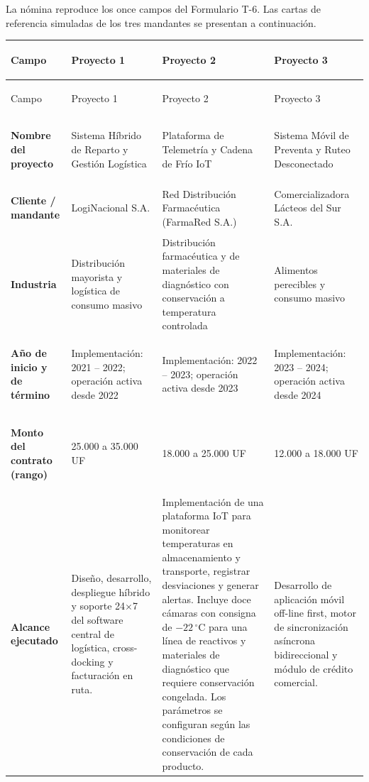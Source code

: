 \documentclass[11pt]{article}
\begin{document}
\clearpage
{}
\par\vspace{2pt}
{\small La nómina reproduce los once campos del Formulario T-6. Las cartas de referencia simuladas de los tres mandantes se presentan a continuación.}
\begingroup
\footnotesize\renewcommand{\arraystretch}{1.0}\setlength{\tabcolsep}{4pt}\setlength{\aboverulesep}{1.5pt}\setlength{\belowrulesep}{1.5pt}
\begin{xltabular}{\linewidth}{@{}>{\bfseries\raggedright\arraybackslash}p{2.3cm} X X X@{}}
\toprule Campo & Proyecto 1 & Proyecto 2 & Proyecto 3 \\
\midrule\endfirsthead
\toprule Campo & Proyecto 1 & Proyecto 2 & Proyecto 3 \\
\midrule\endhead
\bottomrule\endfoot
\bottomrule\endlastfoot
\textbf{Nombre del proyecto} & Sistema Híbrido de Reparto y Gestión Logística & Plataforma de Telemetría y Cadena de Frío IoT & Sistema Móvil de Preventa y Ruteo Desconectado \\
\midrule

\textbf{Cliente / mandante} & LogiNacional S.A. & Red Distribución Farmacéutica (FarmaRed S.A.) & Comercializadora Lácteos del Sur S.A. \\
\midrule

\textbf{Industria} & Distribución mayorista y logística de consumo masivo & Distribución farmacéutica y de materiales de diagnóstico con conservación a temperatura controlada & Alimentos perecibles y consumo masivo \\
\midrule

\textbf{Año de inicio y de término} & Implementación: 2021 -- 2022; operación activa desde 2022 & Implementación: 2022 -- 2023; operación activa desde 2023 & Implementación: 2023 -- 2024; operación activa desde 2024 \\
\midrule

\textbf{Monto del contrato (rango)} & 25.000 a 35.000 UF & 18.000 a 25.000 UF & 12.000 a 18.000 UF \\
\midrule

\textbf{Alcance ejecutado} & Diseño, desarrollo, despliegue híbrido y soporte 24$\times$7 del software central de logística, cross-docking y facturación en ruta. & Implementación de una plataforma IoT para monitorear temperaturas en almacenamiento y transporte, registrar desviaciones y generar alertas. Incluye doce cámaras con consigna de $-22\,^{\circ}\mathrm{C}$ para una línea de reactivos y materiales de diagnóstico que requiere conservación congelada. Los parámetros se configuran según las condiciones de conservación de cada producto. & Desarrollo de aplicación móvil off-line first, motor de sincronización asíncrona bidireccional y módulo de crédito comercial. \\
\midrule


\end{xltabular}
\end{document}

